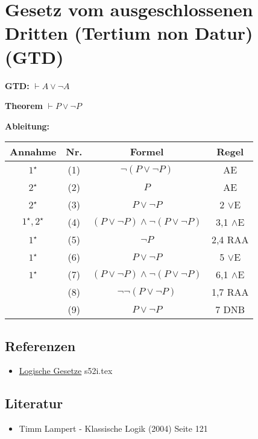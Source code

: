 \documentclass{sajzk}
\begin{document}
\section{Gesetz vom ausgeschlossenen Dritten (Tertium non Datur)(GTD)}
\label{jjkp}
\textbf{GTD:} $\vdash A\lor\lnot A$

\textbf{Theorem} $\vdash P\lor\lnot P$

\textbf{Ableitung:}
\begin{center}
\begin{tabular}{|c|c|c|c|}
  \hline
  Annahme            & Nr. & Formel                                       & Regel \\
  \hline
  $1^\star$          & (1)    & $\lnot(P\lor\lnot P)$                     & AE \\
  \hline
  $2^\star$          & (2)    & $P$                                       & AE \\
  \hline
  $2^\star$          & (3)    & $P\lor\lnot P$                            & 2 $\lor$E \\
  \hline
  $1^\star,2^\star$  & (4)    & $(P\lor\lnot P)\land\lnot(P\lor\lnot P)$  & 3,1 $\land$E \\
  \hline
  $1^\star$          & (5)    & $\lnot P$                                 & 2,4 RAA \\
  \hline
  $1^\star$          & (6)    & $P\lor\lnot P$                            & 5 $\lor$E \\
  \hline
  $1^\star$          & (7)    & $(P\lor\lnot P)\land\lnot(P\lor\lnot P)$  & 6,1 $\land$E \\
  \hline
                     & (8)    & $\lnot\lnot(P\lor\lnot P)$                & 1,7 RAA \\
  \hline
                     & (9)    & $P\lor\lnot P$                            & 7 DNB \\
  \hline
\end{tabular}
\end{center}

\subsection{Referenzen}
\begin{itemize}
    \item \href{s52i.pdf}{Logische Gesetze} s52i.tex
\end{itemize}

\subsection{Literatur}
\begin{itemize}
    \item Timm Lampert - Klassische Logik (2004) Seite 121
\end{itemize}
\end{document}
